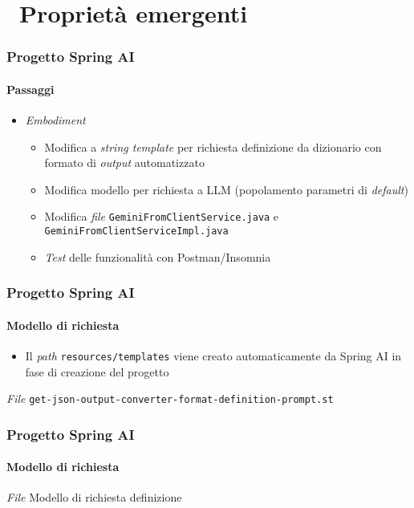 \section{\faWrench\ Proprietà emergenti} %
\label{sec:spring-ai-gemini-emerging-capabilities}
%
\begin{frame}[t,fragile] \frametitle{Progetto Spring AI}
    \framesubtitle{Passaggi}
	\begin{itemize}[leftmargin=10pt,align=right]
        \item[\alert{\faArrowCircleRight}] \textit{Embodiment}
        \begin{itemize}[leftmargin=10pt,align=right]
		    \item[\alertedcircled{1}] Modifica a \textit{string template} per richiesta definizione da dizionario con formato di \textit{output} automatizzato
		    \item[\alertedcircled{2}] Modifica modello per richiesta a LLM (popolamento parametri di \textit{default})
            \item[\alertedcircled{3}] Modifica \textit{file} \texttt{GeminiFromClientService.java} e \texttt{GeminiFromClientServiceImpl.java}
            \item[\alertedcircled{4}] \textit{Test} delle funzionalità con Postman/Insomnia
        \end{itemize}
    \end{itemize}
\end{frame}
%
\begin{frame}[t,fragile] \frametitle{Progetto Spring AI}
    \framesubtitle{Modello di richiesta}
        \begin{itemize}[leftmargin=10pt,align=right]
		    \item[\alert{\faExclamationTriangle}] Il \textit{path} \texttt{resources/templates} viene creato automaticamente da Spring AI in fase di creazione del progetto
        \end{itemize}
        \begin{block}{\textit{File} \texttt{get-json-output-converter-format-definition-prompt.st}}
			{\scriptsize}
    	\end{block}
\end{frame}
%
\begin{frame}[t,fragile] \frametitle{Progetto Spring AI}
    \framesubtitle{Modello di richiesta}
        \begin{block}{\textit{File} Modello di richiesta definizione}
			{\scriptsize}
    	\end{block}
\end{frame}
